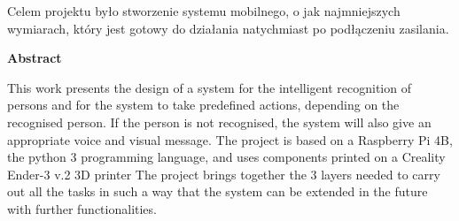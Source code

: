 \documentclass[a4paper,12pt,reqno]{article}
\begin{document}
Celem projektu było stworzenie systemu mobilnego, o jak najmniejszych wymiarach, który jest gotowy do działania natychmiast po podłączeniu zasilania.

%
%
\newpage
\begin{flushleft}
\Large \textbf{Abstract}
\end{flushleft}
\vspace{1cm}
This work presents the design of a system for the intelligent recognition of persons and for the system to take predefined actions, depending on the recognised person. If the person is not recognised, the system will also give an appropriate voice and visual message.
\newline
The project is based on a Raspberry Pi 4B, the python 3 programming language, and uses components printed on a Creality Ender-3 v.2 3D printer
\newline
The project brings together the 3 layers needed to carry out all the tasks in such a way that the system can be extended in the future with further functionalities.
\end{document}
